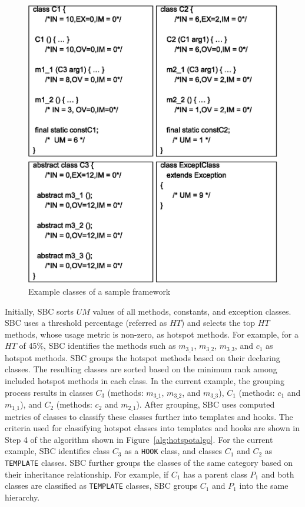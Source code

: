 \documentclass[conference]{IEEEtran}
\newcommand{\CodeIn}[1]{{\small\texttt{#1}}}
\begin{document}
\begin{figure}[t]
\centering
\includegraphics[scale=0.54,clip]{Approach_Example1.eps}
\caption{Example classes of a sample framework} \label{fig:frameworkex}
\end{figure}

Initially, SBC sorts $UM$ values of all methods, constants, and
exception classes. 
SBC uses a threshold percentage (referred as $HT$) and selects the
top $HT$ methods, whose usage metric is non-zero, as hotspot methods. For example, for a $HT$ of 45\%,
SBC identifies the methods such as $m_{3\_1}$, $m_{3\_2}$, $m_{3\_3}$, and $c_1$ as hotspot
methods. SBC groups the hotspot methods based on their declaring classes. 
The resulting classes are sorted based on the minimum rank among included hotspot methods in each class.
In the current example, the grouping process results in 
classes $C_3$ (methods: $m_{3\_1}$, $m_{3\_2}$, and $m_{3\_3}$), 
$C_1$ (methods: $c_1$ and $m_{1\_1}$), and $C_2$ (methods: $c_2$ and $m_{2\_1}$).
After grouping, SBC uses computed metrics of classes
to classify these classes further into templates and hooks. The criteria
used for classifying hotspot classes into templates and hooks are shown in Step 4 of the algorithm
shown in Figure~\ref{alg:hotspotalgo}. For the current example, 
SBC identifies class $C_3$ as a \CodeIn{HOOK} class, and classes
$C_1$ and $C_2$ as \CodeIn{TEMPLATE} classes. SBC further 
groups the classes of the same category based on their inheritance relationship. For example,
if $C_1$ has a parent class $P_1$ and both classes are classified as \CodeIn{TEMPLATE} classes,
SBC groups $C_1$ and $P_1$ into the same hierarchy.
\end{document}
